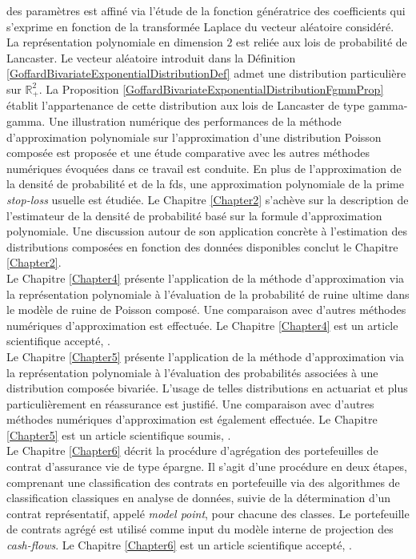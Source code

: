des paramètres est affiné via l\rq{}étude de la fonction génératrice des coefficients qui s\rq{}exprime en fonction de la transformée Laplace du vecteur aléatoire considéré. La représentation polynomiale en dimension $2$ est reliée aux lois de probabilité de Lancaster. Le vecteur aléatoire introduit dans la Définition \ref{GoffardBivariateExponentialDistributionDef} admet une distribution particulière sur $\mathbb{R}_{+}^{2}$. La Proposition \ref{GoffardBivariateExponentialDistributionFgmmProp} établit l\rq{}appartenance de cette distribution aux lois de Lancaster de type gamma-gamma. Une illustration numérique des performances de la méthode d\rq{}approximation polynomiale sur l\rq{}approximation d\rq{}une distribution Poisson composée est proposée et une étude comparative avec les autres méthodes numériques évoquées dans ce travail est conduite. En plus de l\rq{}approximation de la densité de probabilité et de la \gls{fds}, une approximation polynomiale de la prime \textit{stop-loss} usuelle est étudiée. Le Chapitre \ref{Chapter2} s\rq{}achève sur la description de l\rq{}estimateur de la densité de probabilité basé sur la formule d\rq{}approximation polynomiale. Une discussion autour de son application concrète à l\rq{}estimation des distributions composées en fonction des données disponibles conclut le Chapitre \ref{Chapter2}.\\

Le Chapitre \ref{Chapter4} présente l\rq{}application de la méthode d\rq{}approximation via la représentation polynomiale à l\rq{}évaluation de la probabilité de ruine ultime dans le modèle de ruine de Poisson composé. Une comparaison avec d\rq{}autres méthodes numériques d\rq{}approximation est effectuée. Le Chapitre \ref{Chapter4} est un article scientifique accepté, \citet{GoLoPo15a}.\\

Le Chapitre \ref{Chapter5} présente l\rq{}application de la méthode d\rq{}approximation via la représentation polynomiale à l\rq{}évaluation des probabilités associées à une distribution composée bivariée. L\rq{}usage de telles distributions en actuariat et plus particulièrement en réassurance est justifié. Une comparaison avec d\rq{}autres méthodes numériques d\rq{}approximation est également effectuée. Le Chapitre \ref{Chapter5} est un article scientifique soumis, \citet{GoLoPo15b}.\\

Le Chapitre \ref{Chapter6} décrit la procédure d\rq{}agrégation des portefeuilles de contrat d\rq{}assurance vie de type épargne. Il s\rq{}agit d\rq{}une procédure en deux étapes, comprenant une classification des contrats en portefeuille via des algorithmes de classification classiques en analyse de données, suivie de la détermination d\rq{}un contrat représentatif, appelé \textit{model point}, pour chacune des classes. Le portefeuille de contrats agrégé est utilisé comme input du modèle interne de projection des \textit{cash-flows}. Le Chapitre \ref{Chapter6} est un article scientifique accepté, \citet{GoGu15}.  

\renewcommand{\bibsection}{\section*{Mes Publications}}


  